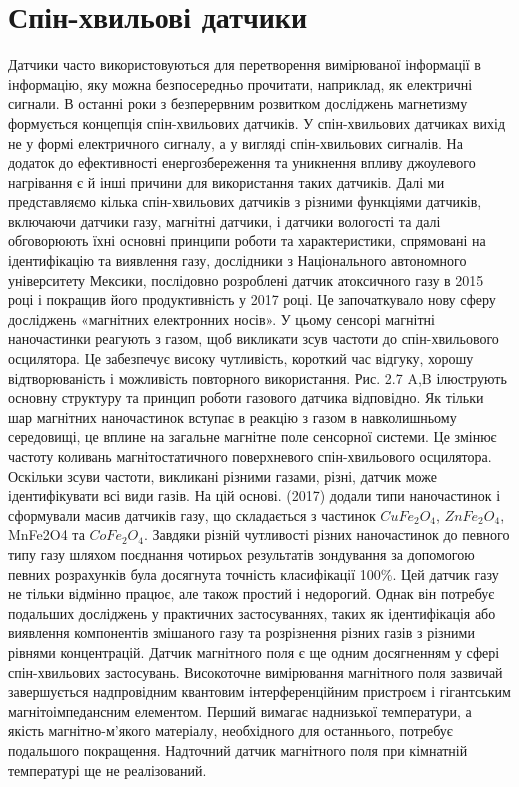 \documentclass[a4paper,14pt]{extreport}
\begin{document}
\section{Спін-хвильові датчики}\par

Датчики часто використовуються для перетворення вимірюваної інформації в інформацію, яку можна безпосередньо прочитати, наприклад, як електричні сигнали. В останні роки з безперервним розвитком досліджень магнетизму формується концепція спін-хвильових датчиків. У спін-хвильових датчиках вихід не у формі електричного сигналу, а у вигляді спін-хвильових сигналів. На додаток до ефективності енергозбереження та уникнення впливу джоулевого нагрівання є й інші причини для використання таких датчиків. Далі ми представляємо кілька спін-хвильових датчиків з різними функціями датчиків, включаючи датчики газу, магнітні датчики, і датчики вологості та далі обговорюють їхні основні принципи роботи та характеристики, спрямовані на ідентифікацію та виявлення газу, дослідники з Національного автономного університету Мексики, послідовно розроблені датчик атоксичного газу в 2015 році і покращив його продуктивність у 2017 році. Це започаткувало нову сферу досліджень «магнітних електронних носів». У цьому сенсорі магнітні наночастинки реагують з газом, щоб викликати зсув частоти до спін-хвильового осцилятора. Це забезпечує високу чутливість, короткий час відгуку, хорошу відтворюваність і можливість повторного використання. Рис. 2.7 A,B ілюструють основну структуру та принцип роботи газового датчика відповідно. Як тільки шар магнітних наночастинок вступає в реакцію з газом в навколишньому середовищі, це вплине на загальне магнітне поле сенсорної системи. Це змінює частоту коливань магнітостатичного поверхневого спін-хвильового осцилятора. Оскільки зсуви частоти, викликані різними газами, різні, датчик може ідентифікувати всі види газів. На цій основі. (2017) додали типи наночастинок і сформували масив датчиків газу, що складається з частинок $CuFe_2O_4$, $ZnFe_2O_4$, MnFe2O4 та $CoFe_2O_4$. Завдяки різній чутливості різних наночастинок до певного типу газу шляхом поєднання чотирьох результатів зондування за допомогою певних розрахунків була досягнута точність класифікації 100\%. Цей датчик газу не тільки відмінно працює, але також простий і недорогий. Однак він потребує подальших досліджень у практичних застосуваннях, таких як ідентифікація або виявлення компонентів змішаного газу та розрізнення різних газів з різними рівнями концентрацій. Датчик магнітного поля є ще одним досягненням у сфері спін-хвильових застосувань. Високоточне вимірювання магнітного поля зазвичай завершується надпровідним квантовим інтерференційним пристроєм  і гігантським магнітоімпедансним елементом. Перший вимагає наднизької температури, а якість магнітно-м’якого матеріалу, необхідного для останнього, потребує подальшого покращення. Надточний датчик магнітного поля при кімнатній температурі ще не реалізований. 
\end{document}
